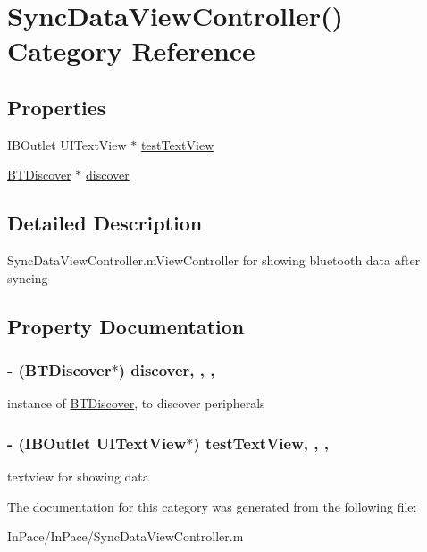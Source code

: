 \hypertarget{categorySyncDataViewController_07_08}{\section{Sync\-Data\-View\-Controller() Category Reference}
\label{categorySyncDataViewController_07_08}
}
\subsection*{Properties}
\begin{DoxyCompactItemize}
\item 
I\-B\-Outlet U\-I\-Text\-View $\ast$ \hyperlink{categorySyncDataViewController_07_08_a1906b00e4feb73b83bc17f027f8c2bb5}{test\-Text\-View}
\item 
\hyperlink{interfaceBTDiscover}{B\-T\-Discover} $\ast$ \hyperlink{categorySyncDataViewController_07_08_a6c275b0707fdbdb6734f68f3e9e589d0}{discover}
\end{DoxyCompactItemize}


\subsection{Detailed Description}
Sync\-Data\-View\-Controller.\-m\-View\-Controller for showing bluetooth data after syncing 

\subsection{Property Documentation}
\hypertarget{categorySyncDataViewController_07_08_a6c275b0707fdbdb6734f68f3e9e589d0}{
\subsubsection[{discover}]{\setlength{\rightskip}{0pt plus 5cm}-\/ ({\bf B\-T\-Discover}$\ast$) discover\hspace{0.3cm}{\ttfamily [read]}, {\ttfamily [write]}, {\ttfamily [atomic]}, {\ttfamily [strong]}}}\label{categorySyncDataViewController_07_08_a6c275b0707fdbdb6734f68f3e9e589d0}
instance of \hyperlink{interfaceBTDiscover}{B\-T\-Discover}, to discover peripherals \hypertarget{categorySyncDataViewController_07_08_a1906b00e4feb73b83bc17f027f8c2bb5}{
\subsubsection[{test\-Text\-View}]{\setlength{\rightskip}{0pt plus 5cm}-\/ (I\-B\-Outlet U\-I\-Text\-View$\ast$) test\-Text\-View\hspace{0.3cm}{\ttfamily [read]}, {\ttfamily [write]}, {\ttfamily [nonatomic]}, {\ttfamily [weak]}}}\label{categorySyncDataViewController_07_08_a1906b00e4feb73b83bc17f027f8c2bb5}
textview for showing data 

The documentation for this category was generated from the following file\-:\begin{DoxyCompactItemize}
\item 
In\-Pace/\-In\-Pace/Sync\-Data\-View\-Controller.\-m\end{DoxyCompactItemize}
